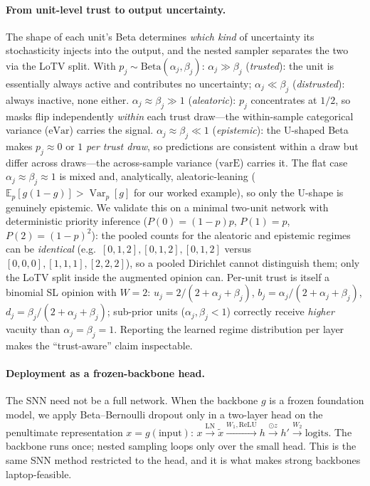 \documentclass[11pt]{article}
\newcommand{\Eb}{\mathbb{E}}
\newcommand{\Var}{\operatorname{Var}}
\begin{document}
\paragraph{From unit-level trust to output uncertainty.}
The shape of each unit's Beta determines \emph{which kind} of uncertainty its
stochasticity injects into the output, and the nested sampler separates the two via
the LoTV split. With $p_j\sim\mathrm{Beta}(\alpha_j,\beta_j)$:
$\alpha_j\!\gg\!\beta_j$ (\emph{trusted}): the unit is essentially always active and
contributes no uncertainty; $\alpha_j\!\ll\!\beta_j$ (\emph{distrusted}): always
inactive, none either. $\alpha_j\!\approx\!\beta_j\!\gg\!1$ (\emph{aleatoric}): $p_j$
concentrates at $1/2$, so masks flip independently \emph{within} each trust draw---the
within-sample categorical variance ($\mathrm{eVar}$) carries the signal.
$\alpha_j\!\approx\!\beta_j\!\ll\!1$ (\emph{epistemic}): the U-shaped Beta makes
$p_j\!\approx\!0$ or $1$ \emph{per trust draw}, so predictions are consistent within a
draw but differ across draws---the across-sample variance ($\mathrm{varE}$) carries it.
The flat case $\alpha_j\!\approx\!\beta_j\!\approx\!1$ is mixed and, analytically,
aleatoric-leaning ($\Eb_p[g(1-g)]>\Var_p[g]$ for our worked example), so only the
U-shape is genuinely epistemic. We validate this on a minimal two-unit network with
deterministic priority inference ($P(0)=(1-p)p$, $P(1)=p$, $P(2)=(1-p)^2$): the
pooled counts for the aleatoric and epistemic regimes can be \emph{identical}
(e.g.\ $[0,1,2],[0,1,2],[0,1,2]$ versus $[0,0,0],[1,1,1],[2,2,2]$), so a pooled
Dirichlet cannot distinguish them; only the LoTV split inside the augmented opinion
can. Per-unit trust is itself a binomial SL opinion with $W{=}2$:
$u_j=2/(2+\alpha_j+\beta_j)$, $b_j=\alpha_j/(2+\alpha_j+\beta_j)$,
$d_j=\beta_j/(2+\alpha_j+\beta_j)$; sub-prior units ($\alpha_j,\beta_j<1$) correctly
receive \emph{higher} vacuity than $\alpha_j=\beta_j=1$. Reporting the learned regime
distribution per layer makes the ``trust-aware'' claim inspectable.

\paragraph{Deployment as a frozen-backbone head.}
The SNN need not be a full network. When the backbone $g$ is a frozen foundation model,
we apply Beta--Bernoulli dropout only in a two-layer head on the penultimate
representation $x=g(\text{input})$:
$x\!\xrightarrow{\text{LN}}\!\tilde x\!\xrightarrow{W_1,\mathrm{ReLU}}\!h\!\xrightarrow{\odot z}\!h'\!\xrightarrow{W_2}\!\text{logits}$.
The backbone runs once; nested sampling loops only over the small head. This is the same
SNN method restricted to the head, and it is what makes strong backbones laptop-feasible.
\end{document}

